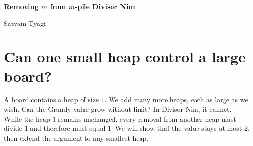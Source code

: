 \documentclass[11pt]{article}
\begin{document}
\begin{center}
 {\fontsize{23}{27}\selectfont\bfseries\color{Ink}
 Removing $m$ from $m$-pile Divisor Nim\par}
 \vspace{9pt}
 Satyam Tyagi
\end{center}
\vspace{2pt}

\begin{abstract}
In Divisor Nim, a player removes from one heap a positive number of stones that
divides the size of every other heap. We prove that the Sprague--Grundy (SG) value
satisfies $g(P)\le 2h_{\min}+\lfloor\log_2h_{\min}\rfloor$, where $h_{\min}$ is the
smallest nonempty heap, independently of the number and sizes of the other heaps.
The proof starts with odd heaps and classifies removals by their factors of $2$.
The largest heap in a starting board then supplies an SG bound valid throughout
every successor chain.

When one heap varies, we sharpen Morisawa's eventual-period bound: the smallest
fixed heap controls the SG value range, the number of consecutive values compared,
and an increase in the varying heap that repeats legal moves. The remaining
dependence on the fixed board lies in the SG periods of direct successors. Using
the largest fixed heap, we derive an explicit common period for all these recursive
layers. Its possible prime divisors belong to a fixed finite set, independent of
heap count; their exponents remain controlled by the total fixed stones.
Finally, joining boards under one shared divisor rule preserves and can tighten
the SG ceiling. Minimum 2-adic depth and its count parity determine every joined
outcome, and a join with at least two odd heaps has exact SG value $0$ or $1$.

We close with two conjectures: $g(P)\le2h_{\min}$, and that the least eventual SG
period, when one heap varies, divides $2\operatorname{lcm}(1,\ldots,h_{\max})$.
Here $h_{\max}$ is the largest fixed heap, excluding the varying heap. The second
claim would remove heap-count dependence from the period bound as well.
\end{abstract}

\section{Can one small heap control a large board?}
\label{sec:intro}

A board contains a heap of size $1$. We add many more heaps, each as
large as we wish. Can the Grundy value grow without limit? In Divisor
Nim, it cannot. While the heap $1$ remains unchanged, every removal
from another heap must divide $1$ and therefore must equal $1$.
We will show that the value stays at most $2$, then extend the argument
to any smallest heap.
\end{document}

